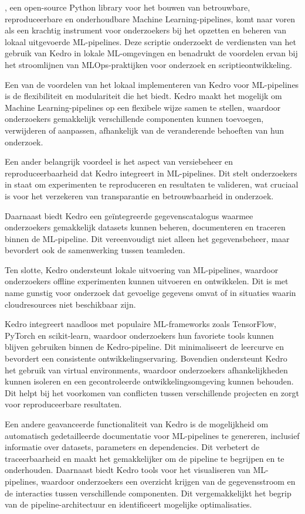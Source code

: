 \textcite{Kedro2024}, een open-source Python library voor het bouwen van betrouwbare, reproduceerbare en onderhoudbare Machine Learning-pipelines, komt naar voren als een krachtig instrument voor onderzoekers bij het opzetten en beheren van lokaal uitgevoerde ML-pipelines. Deze scriptie onderzoekt de verdiensten van het gebruik van Kedro in lokale ML-omgevingen en benadrukt de voordelen ervan bij het stroomlijnen van MLOps-praktijken voor onderzoek en scriptieontwikkeling.

Een van de voordelen van het lokaal implementeren van Kedro voor ML-pipelines is de flexibiliteit en modulariteit die het biedt. Kedro maakt het mogelijk om Machine Learning-pipelines op een flexibele wijze samen te stellen, waardoor onderzoekers gemakkelijk verschillende componenten kunnen toevoegen, verwijderen of aanpassen, afhankelijk van de veranderende behoeften van hun onderzoek.

Een ander belangrijk voordeel is het aspect van versiebeheer en reproduceerbaarheid dat Kedro integreert in ML-pipelines. Dit stelt onderzoekers in staat om experimenten te reproduceren en resultaten te valideren, wat cruciaal is voor het verzekeren van transparantie en betrouwbaarheid in onderzoek.

Daarnaast biedt Kedro een geïntegreerde gegevenscatalogus waarmee onderzoekers gemakkelijk datasets kunnen beheren, documenteren en traceren binnen de ML-pipeline. Dit vereenvoudigt niet alleen het gegevensbeheer, maar bevordert ook de samenwerking tussen teamleden.

Ten slotte, Kedro ondersteunt lokale uitvoering van ML-pipelines, waardoor onderzoekers offline experimenten kunnen uitvoeren en ontwikkelen. Dit is met name gunstig voor onderzoek dat gevoelige gegevens omvat of in situaties waarin cloudresources niet beschikbaar zijn.

Kedro integreert naadloos met populaire ML-frameworks zoals TensorFlow, PyTorch en scikit-learn, waardoor onderzoekers hun favoriete tools kunnen blijven gebruiken binnen de Kedro-pipeline. Dit minimaliseert de leercurve en bevordert een consistente ontwikkelingservaring. Bovendien ondersteunt Kedro het gebruik van virtual environments, waardoor onderzoekers afhankelijkheden kunnen isoleren en een gecontroleerde ontwikkelingsomgeving kunnen behouden. Dit helpt bij het voorkomen van conflicten tussen verschillende projecten en zorgt voor reproduceerbare resultaten.

Een andere geavanceerde functionaliteit van Kedro is de mogelijkheid om automatisch gedetailleerde documentatie voor ML-pipelines te genereren, inclusief informatie over datasets, parameters en dependencies. Dit verbetert de traceerbaarheid en maakt het gemakkelijker om de pipeline te begrijpen en te onderhouden. Daarnaast biedt Kedro tools voor het visualiseren van ML-pipelines, waardoor onderzoekers een overzicht krijgen van de gegevensstroom en de interacties tussen verschillende componenten. Dit vergemakkelijkt het begrip van de pipeline-architectuur en identificeert mogelijke optimalisaties.


